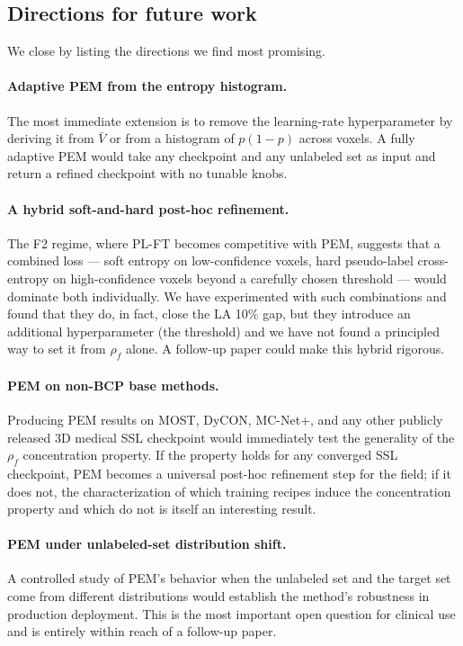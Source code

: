 \subsection{Directions for future work}
\label{sec:disc:future}

We close by listing the directions we find most promising.

\paragraph{Adaptive PEM from the entropy histogram.}
The most immediate extension is to remove the learning-rate hyperparameter by deriving it from $\bar V$ or from a histogram of $p(1{-}p)$ across voxels. A fully adaptive PEM would take any checkpoint and any unlabeled set as input and return a refined checkpoint with no tunable knobs.

\paragraph{A hybrid soft-and-hard post-hoc refinement.}
The F2 regime, where PL-FT becomes competitive with PEM, suggests that a combined loss --- soft entropy on low-confidence voxels, hard pseudo-label cross-entropy on high-confidence voxels beyond a carefully chosen threshold --- would dominate both individually. We have experimented with such combinations and found that they do, in fact, close the LA 10\% gap, but they introduce an additional hyperparameter (the threshold) and we have not found a principled way to set it from $\rho_f$ alone. A follow-up paper could make this hybrid rigorous.

\paragraph{PEM on non-BCP base methods.}
Producing PEM results on MOST, DyCON, MC-Net+, and any other publicly released 3D medical SSL checkpoint would immediately test the generality of the $\rho_f$ concentration property. If the property holds for any converged SSL checkpoint, PEM becomes a universal post-hoc refinement step for the field; if it does not, the characterization of which training recipes induce the concentration property and which do not is itself an interesting result.

\paragraph{PEM under unlabeled-set distribution shift.}
A controlled study of PEM's behavior when the unlabeled set and the target set come from different distributions would establish the method's robustness in production deployment. This is the most important open question for clinical use and is entirely within reach of a follow-up paper.

